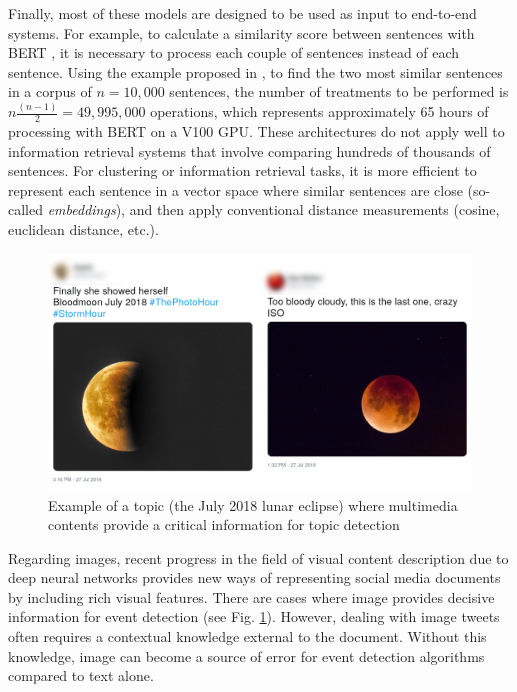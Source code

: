 Finally, most of these models are designed to be used as input to
end-to-end systems. For example, to calculate a similarity score between sentences
with BERT \cite{devlin2018bert}, it is necessary to process each couple of sentences instead of each sentence. Using the example proposed in \cite{reimers_2019_sentence}, to find the two most similar sentences in a corpus of $n = 10,000$ sentences, the number of treatments to be performed is $n\frac{(n - 1)}{2} = 49,995,000$ operations, which represents approximately 65 hours of processing with BERT on a V100 GPU.
These architectures do not apply well to information retrieval systems that involve comparing
hundreds of thousands of sentences. For clustering or information retrieval tasks, 
it is more efficient to represent each sentence in a vector space where similar sentences
 are close (so-called \textit{embeddings}), and then apply conventional distance measurements 
 (cosine, euclidean distance, etc.).
 
 \begin{figure}
  \includegraphics[width=\textwidth]{figures/Moon_horizontal.png}
    \caption{Example of a topic (the July 2018 lunar eclipse) where multimedia contents provide a critical information for topic detection}
    \label{fig:moon}
\end{figure}
 
 Regarding images, recent progress in the field of visual content description due to deep neural networks provides new ways of representing social media documents by including rich visual features. There are cases where image provides decisive information for event detection (see Fig. \ref{fig:moon}). However, dealing with image tweets often requires a contextual knowledge external to the document. Without this knowledge, image can become a source of error for event detection algorithms compared to text alone.
 
